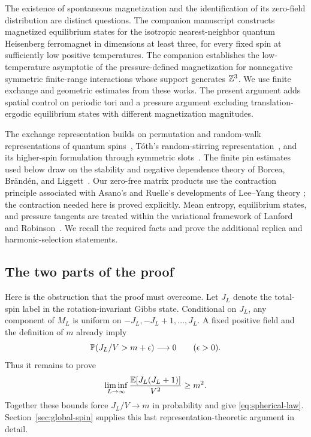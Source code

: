 The existence of spontaneous magnetization and the identification of its
zero-field distribution are distinct questions. The companion manuscript
\cite{Ord} constructs magnetized equilibrium states for the isotropic
nearest-neighbor quantum Heisenberg ferromagnet in dimensions at least
three, for every fixed spin at sufficiently low positive temperatures.
The companion \cite{BL} establishes the low-temperature asymptotic
of the pressure-defined magnetization for nonnegative symmetric
finite-range interactions whose support generates $\mathbb Z^3$.
We use finite exchange and geometric estimates from these works. The present
argument adds spatial control on periodic tori and a pressure argument
excluding translation-ergodic equilibrium states with different
magnetization magnitudes.

The exchange representation builds on permutation and random-walk
representations of quantum spins~\cite{Powers1976,ConlonSolovej1991Representation},
T\'oth's random-stirring representation~\cite{Toth1993}, and its
higher-spin formulation through symmetric slots~\cite{Nachtergaele1994}.
The finite pin estimates used below draw on the stability and negative
dependence theory of Borcea, Br\"and\'en, and Liggett~\cite{BBL2009}.
Our zero-free matrix products use the contraction principle associated
with Asano's and Ruelle's developments of Lee--Yang theory
\cite{Asano1970,Ruelle1971,Ruelle1973}; the contraction needed here is
proved explicitly. Mean entropy, equilibrium states, and pressure
tangents are treated within the variational framework of Lanford and
Robinson~\cite{LanfordRobinson1968Entropy,LanfordRobinson1968Spin}.
We recall the required facts and prove the additional replica and
harmonic-selection statements.

\subsection{The two parts of the proof}\label{subsec:strategy}
Here is the obstruction that the proof must overcome. Let $J_L$ denote the
total-spin label in the rotation-invariant Gibbs state. Conditional on
$J_L$, any component of $M_L$ is uniform on
$-J_L,-J_L+1,\ldots,J_L$. A fixed positive field and the definition of $m$
already imply
\begin{equation}\label{eq:overview-upper}
 \mathbb P(J_L/V>m+\epsilon)\longrightarrow0
 \qquad(\epsilon>0).
\end{equation}
Thus it remains to prove
\begin{equation}\label{eq:overview-lower}
 \liminf_{L\to\infty}\frac{\mathbb E[J_L(J_L+1)]}{V^2}\ge m^2.
\end{equation}
Together these bounds force $J_L/V\to m$ in probability and give
\eqref{eq:spherical-law}. Section~\ref{sec:global-spin} supplies this
last representation-theoretic argument in detail.

